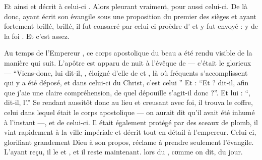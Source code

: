 Et ainsi  et décrit à celui-ci .
Alors  pleurant vraiment,   pour  aussi   celui-ci.
De là donc,  ayant écrit son évangile sous une proposition du premier des sièges et ayant fortement brillé,  brillé, il fut consacré par celui-ci  proèdre d' et  y fut envoyé : y  de la foi . 
Et c'est assez. 

Au temps de l'Empereur , ce corps apostolique du beau  a été rendu visible de la manière qui suit. L'apôtre est apparu de nuit à l'évêque de  --- c'était le glorieux  --- \enquote{Viens-donc, lui dit-il, ,  éloigné d'elle de   et , là où  fréquents s'accomplissent  qui y a été déposé, et dans celui-ci  du Christ, c'est celui } %
 Et  : \enquote{Et  ? dit-il, afin que j'aie une claire compréhension, de quel dépouille s'agit-il donc ?}. Et lui : \enquote{, dit-il,  l'.}
Se rendant aussitôt  donc au lieu et creusant avec foi, il trouva le coffre, celui dans lequel était le corps apostolique --- on aurait dit qu'il avait été inhumé à l'instant ---, et  de celui-ci.
Il était également protégé par des sceaux de plomb, 
il vint rapidement à la ville impériale et décrit tout en détail à l'empereur. %
Celui-ci, glorifiant grandement Dieu à son propos, réclame  à prendre seulement l'évangile.
L'ayant reçu, il le  et , et il reste  maintenant.
 lors du , cοmme on dit,  du jour.


